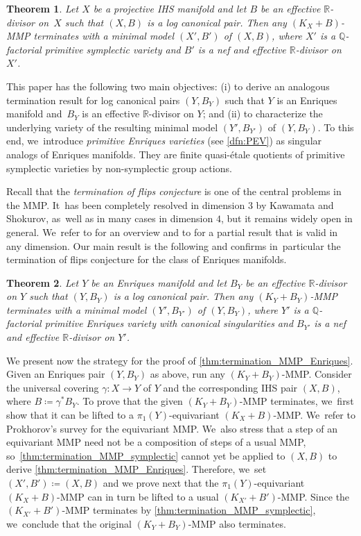 \documentclass[10pt]{amsart}
\theoremstyle{plain}
\newtheorem{thm}{Theorem}[section]
\theoremstyle{definition}
\newcommand{\Q}{\mathbb{Q}}
\newcommand{\R}{\mathbb{R}}
\begin{document}
\begin{thm}
\label{thm:termination_MMP_symplectic}
Let $X$ be a projective IHS manifold and let $B$ be an effective $\R$\nobreakdash-divisor on~$X$ such that $(X,B)$ is a log canonical pair. Then any $(K_X + B)$-MMP terminates with a minimal model $(X',B')$ of $(X,B)$, where $X'$ is a $\Q$\nobreakdash-factorial primitive symplectic variety and $B'$ is a nef and effective $\R$\nobreakdash-divisor on $X'$.
\end{thm}

This paper has the following two main objectives: (i) to derive an analogous termination result for log canonical pairs $(Y,B_Y)$ such that $Y$ is an Enriques manifold and~$B_Y$ is an effective $\R$\nobreakdash-divisor on $Y$; and (ii) to characterize the underlying variety of the resulting minimal model $(Y',B_{Y'})$ of $(Y,B_Y)$. To this end, we~introduce \emph{primitive Enriques varieties} (see \autoref{dfn:PEV}) as singular analogs of Enriques manifolds. They are finite quasi-étale quotients of primitive symplectic varieties by non-symplectic group actions.

Recall that the \emph{termination of flips conjecture} is one of the central problems in the MMP. It~has been completely resolved in dimension $ 3 $ by Kawamata and Shokurov, as~well as in many cases in dimension $ 4 $, but it remains widely open in general. We~refer to \cite[\S 1]{ChenTsak23} for an overview and to \cite[Cor.\,1.4.2]{BCHM10} for a partial result that is valid in any dimension. Our main result is the following and confirms in~particular the termination of flips conjecture for the class of Enriques manifolds.

\begin{thm}
\label{thm:termination_MMP_Enriques}
Let $Y$ be an Enriques manifold and let $B_Y$ be an effective $\R$\nobreakdash-divisor on $Y$ such that $(Y,B_Y)$ is a log canonical pair. Then any $(K_Y + B_Y)$-MMP terminates with a minimal model $(Y',B_{Y'})$ of $(Y,B_Y)$, where $Y'$ is a $\Q$\nobreakdash-factorial primitive Enriques variety with canonical singularities and $B_{Y'}$ is a nef and effective $\R$\nobreakdash-divisor on $Y'$.
\end{thm}

We present now the strategy for the proof of \autoref{thm:termination_MMP_Enriques}. Given an Enriques pair $(Y,B_Y)$ as above, run any $(K_Y+B_Y)$-MMP. Consider the universal covering $\gamma \colon X \to Y$ of $Y$ and the corresponding IHS pair $(X,B)$, where $B \coloneqq \gamma^* B_Y$. To prove that the given $(K_Y+B_Y)$-MMP terminates, we~first show that it can be lifted to a $\pi_1(Y)$-equivariant $(K_X+B)$-MMP. We~refer to Prokhorov's survey \cite{Pro21} for the equivariant MMP. We~also stress that a step of an equivariant MMP need not be a composition of steps of a usual MMP, so~\autoref{thm:termination_MMP_symplectic} cannot yet be applied to $(X,B)$ to derive \autoref{thm:termination_MMP_Enriques}.
Therefore, we~set $(X',B') \coloneqq (X, B)$ and we prove next that the $\pi_1(Y)$-equivariant $(K_X+B)$-MMP can in turn be lifted to a usual $(K_{X'} + B')$-MMP.
Since the $(K_{X'} + B')$-MMP terminates by \autoref{thm:termination_MMP_symplectic}, we~conclude that the original $(K_Y+B_Y)$-MMP also terminates.\enlargethispage{.5\baselineskip}
\end{document}

